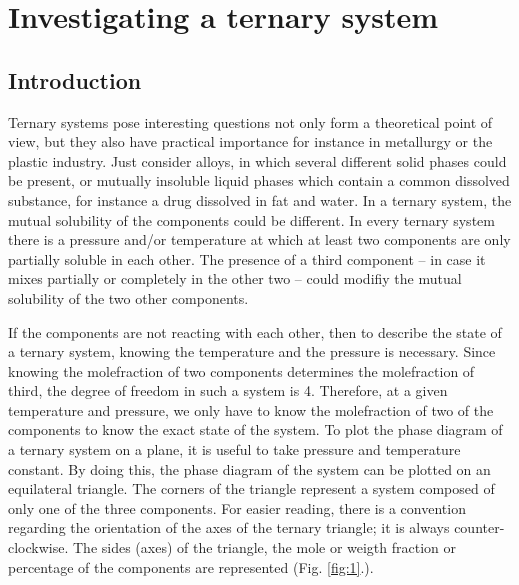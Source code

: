 \section{Investigating a ternary system}
\subsection{Introduction}

Ternary systems pose interesting questions not only form a theoretical point of view, but they also have practical importance for instance in metallurgy or the plastic industry. Just consider alloys, in which several different solid phases could be present, or mutually insoluble liquid phases which contain a common dissolved substance, for instance a drug dissolved in fat and water. In a ternary system, the mutual solubility of the components could be different. In every ternary system there is a pressure and/or temperature at which at least two components are only partially soluble in each other. The presence of a third component -- in case it mixes partially or completely in the other two -- could modifiy the mutual solubility of the two other components.

If the components are not reacting with each other, then to describe the state of a ternary system, knowing the temperature and the pressure is necessary. Since knowing the molefraction of two components determines the molefraction of third, the degree of freedom in such a system is 4. Therefore, at a given temperature and pressure, we only have to know the molefraction of two of the components to know the exact state of the system. To plot the phase diagram of a ternary system on a plane, it is useful to take pressure and temperature constant. By doing this, the phase diagram of the system can be plotted on an equilateral triangle. The corners of the triangle represent a system composed of only one of the three components. For easier reading, there is a convention regarding the orientation of the axes of the ternary triangle; it is always counter-clockwise. The sides (axes) of the triangle, the mole or weigth fraction or percentage of the components are represented (Fig. \ref{fig:1}.).

